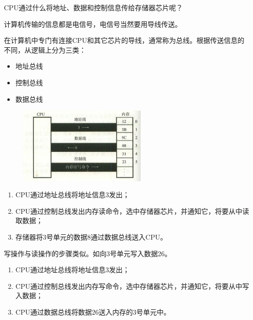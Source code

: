 % 
\begin{frame}
  \begin{question}{}
    CPU通过什么将地址、数据和控制信息传给存储器芯片呢？
  \end{question} \pause 
  
  计算机传输的信息都是电信号，电信号当然要用导线传送。

  \begin{defn}[总线]{}
    在计算机中专门有连接CPU和其它芯片的导线，通常称为总线。根据传送信息的不同，从逻辑上分为三类： 

    \begin{itemize}
    \item 地址总线 
    \item 控制总线 
    \item 数据总线
    \end{itemize}
  \end{defn}
\end{frame}
% 
\begin{frame}
  \begin{exam}[]{}
    \begin{figure}
      \centering
      \includegraphics[width=2.5in]{ch01/images/cpu_read}
    \end{figure}
    \begin{enumerate}
    \item CPU通过地址总线将地址信息$3$发出；
    \item CPU通过控制总线发出内存读命令，选中存储器芯片，并通知它，将要从中读取数据；
    \item 存储器将$3$号单元的数据$8$通过数据总线送入CPU。
    \end{enumerate}
  \end{exam}
\end{frame}
% 
\begin{frame}
  写操作与读操作的步骤类似。如向$3$号单元写入数据26。\vspace{0.1in}

  \begin{enumerate}
  \item CPU通过地址总线将地址信息$3$发出；
  \item CPU通过控制总线发出内存写命令，选中存储器芯片，并通知它，将要从中写入数据；
  \item CPU通过数据总线将数据$26$送入内存的$3$号单元中。
  \end{enumerate}
\end{frame}
